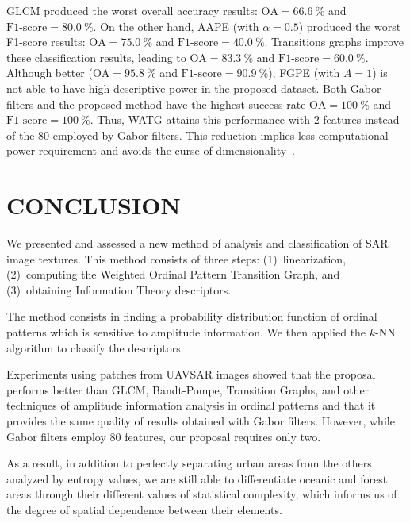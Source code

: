 \documentclass[journal]{IEEEtran}
\begin{document}
GLCM produced the worst overall accuracy results: $\text{OA}=\SI{66.6}{\percent}$ and $\text{F1-score}=\SI{80.0}{\percent}$.
%
On the other hand, AAPE (with $\alpha = 0.5$) produced the worst F1-score results:
$\text{OA}=\SI{75.0}{\percent}$ and $\text{F1-score}=\SI{40.0}{\percent}$.
%
Transitions graphs improve these classification results, leading to  $\text{OA}=\SI{83.3}{\percent}$ and $\text{F1-score}=\SI{60.0}{\percent}$.
%
Although better ($\text{OA}=\SI{95.8}{\percent}$ and $\text{F1-score}=\SI{90.9}{\percent}$), FGPE (with $A = 1$) is not able to have high descriptive power in the proposed dataset.
%
Both Gabor filters and the proposed method have the highest success rate $\text{OA}=\SI{100}{\percent}$ and $\text{F1-score}=\SI{100}{\percent}$.
Thus, WATG attains this performance with $2$ features instead of the $80$ employed by Gabor filters.
This reduction implies less computational power requirement and avoids the curse of dimensionality~\cite{TheCursesofDimensionality2018}.

\section{CONCLUSION}\label{Conclusion}

We presented and assessed a new method of analysis and classification of SAR image textures.
This method consists of three steps: 
(1)~linearization, 
(2)~computing the Weighted Ordinal Pattern Transition Graph, and 
(3)~obtaining Information Theory descriptors.

The method consists in finding a probability distribution function of ordinal patterns which is sensitive to amplitude information.
We then applied the $k$-NN algorithm to classify the descriptors.

Experiments using patches from UAVSAR images showed that the proposal performs better than GLCM, Bandt-Pompe, Transition Graphs, and other techniques of amplitude information analysis in ordinal patterns and that it provides the same quality of results obtained with Gabor filters.
However, while Gabor filters employ $80$ features, our proposal requires only two.

As a result, in addition to perfectly separating urban areas from the others analyzed by entropy values, we are still able to differentiate oceanic and forest areas through their different values of statistical complexity, which informs us of the degree of spatial dependence between their elements.
\end{document}
